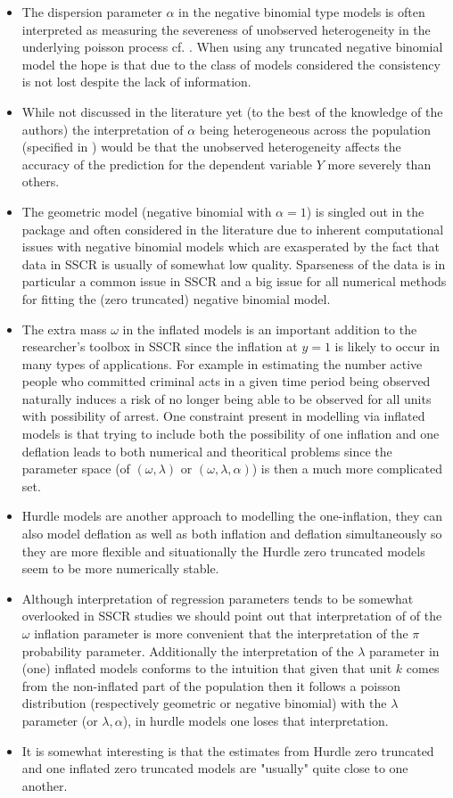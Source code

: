 \documentclass[
]{jss}
\newcommand{\1}{\mathcal{I}} \newcommand{\bx}{\boldsymbol{x}}
\begin{document}
\begin{itemize}
  \item The dispersion parameter $\alpha$ in the negative binomial type models is often interpreted as measuring the severeness of unobserved heterogeneity in the underlying poisson process cf. \cite{ztnegbin}. When using any truncated negative binomial model the hope is that due to the class of models considered the consistency is not lost despite the lack of information.
  \item While not discussed in the literature yet (to the best of the knowledge of the authors) the interpretation of $\alpha$ being heterogeneous across the population (specified in ) would be that the unobserved heterogeneity affects the accuracy of the prediction for the dependent variable $Y$ more severely than others.
  \item The geometric model (negative binomial with $\alpha=1$) is singled out in the package and often considered in the literature due to inherent computational issues with negative binomial models which are exasperated by the fact that data in SSCR is usually of somewhat low quality. Sparseness of the data is in particular a common issue in SSCR and a big issue for all numerical methods for fitting the (zero truncated) negative binomial model.
  \item The extra mass $\omega$ in the inflated models is an important addition to the researcher's toolbox in SSCR since the inflation at $y=1$ is likely to occur in many types of applications. For example in estimating the number active people who committed criminal acts in a given time period being observed naturally induces a risk of no longer being able to be observed for all units with possibility of arrest. One constraint present in modelling via inflated models is that trying to include both the possibility of one inflation and one deflation leads to both numerical and theoritical problems since the parameter space (of $(\omega, \lambda)$ or $(\omega, \lambda, \alpha)$) is then a much more complicated set.
  \item Hurdle models are another approach to modelling the one-inflation, they can also model deflation as well as both inflation and deflation simultaneously so they are more flexible and situationally the Hurdle zero truncated models seem to be more numerically stable.
  \item Although interpretation of regression parameters tends to be somewhat overlooked in SSCR studies we should point out that interpretation of  of the $\omega$ inflation parameter is more convenient that the interpretation of the $\pi$ probability parameter. Additionally the interpretation of the $\lambda$ parameter in (one) inflated models conforms to the intuition that given that unit $k$ comes from the non-inflated part of the population then it follows a poisson distribution (respectively geometric or negative binomial) with the $\lambda$ parameter (or $\lambda,\alpha$), in hurdle models one loses that interpretation.
  \item It is somewhat interesting is that the estimates from Hurdle zero truncated and one inflated zero truncated models are "usually" quite close to one another.
\end{itemize}
\end{document}

